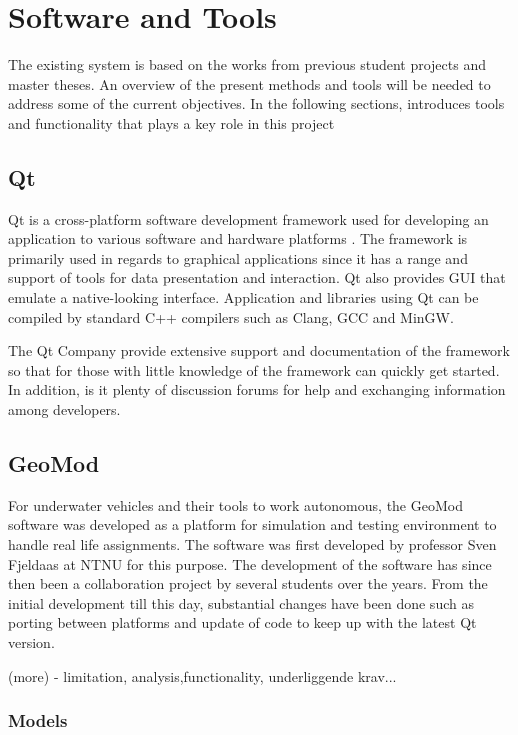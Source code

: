 \chapter{Software and Tools}
\label{existing_tech}

The existing system is based on the works from previous student projects and master theses. An overview of the present methods and tools will be needed to address some of the current objectives. In the following sections, introduces tools and functionality that plays a key role in this project

\section{Qt}

Qt is a cross-platform software development framework used for developing an application to various software and hardware platforms \cite{qt}. The framework is primarily used in regards to graphical applications since it has a range and support of tools for data presentation and interaction. Qt also provides GUI that emulate a native-looking interface. Application and libraries using Qt can be compiled by standard C++ compilers such as Clang, GCC and MinGW. 

The Qt Company provide extensive support and documentation of the framework so that for those with little knowledge of the framework can quickly get started. In addition, is it plenty of discussion forums for help and exchanging information among developers.

\section{GeoMod}

For underwater vehicles and their tools to work autonomous, the GeoMod software was developed as a platform for simulation and testing environment to handle real life assignments. The software was first developed by professor Sven Fjeldaas at NTNU for this purpose. The development of the software has since then been a collaboration project by several students over the years. From the initial development till this day, substantial changes have been done such as porting between platforms and update of code to keep up with the latest Qt version.

(more) - limitation, analysis,functionality, underliggende krav...

\subsection{Models}

